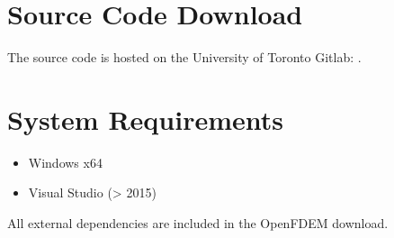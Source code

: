 \documentclass[letterpaper,10pt,english]{sphinxmanual}
\begin{document}
\section{Source Code Download}
\label{\detokenize{rst_about_project/started:source-code-download}}
The source code is hosted on the University of Toronto Gitlab: .


\section{System Requirements}
\label{\detokenize{rst_about_project/started:system-requirements}}\begin{itemize}
\item {} 
Windows x64

\item {} 
Visual Studio (\textgreater{} 2015)

\end{itemize}

All external dependencies are included in the OpenFDEM download.
\end{document}
